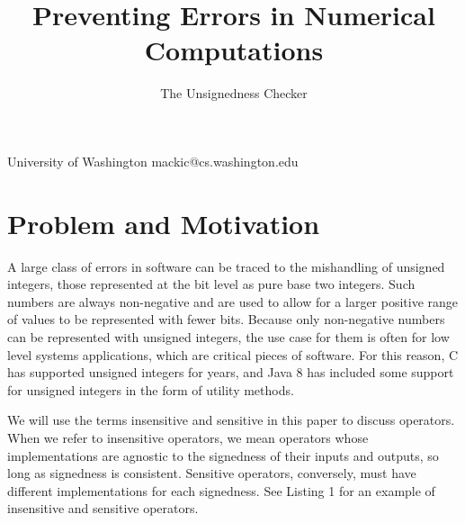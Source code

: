 \documentclass{sigplanconf}
\begin{document}
\setlength{\pdfpageheight}{\paperheight}
\setlength{\pdfpagewidth}{\paperwidth}

\title{Preventing Errors in Numerical Computations}
\subtitle{The Unsignedness Checker}

           {University of Washington}
           {mackic@cs.washington.edu}

\maketitle


\section{Problem and Motivation}

A large class of errors in software can be traced to the mishandling of unsigned integers, those represented at the bit level as pure base two integers. Such numbers are always non-negative and are used to allow for a larger positive range of values to be represented with fewer bits. Because only non-negative numbers can be represented with unsigned integers, the use case for them is often for low level systems applications, which are critical pieces of software. For this reason, C has supported unsigned integers for years, and Java 8 has included some support for unsigned integers in the form of utility methods.

We will use the terms insensitive and sensitive in this paper to discuss operators. When we refer to insensitive operators, we mean operators whose implementations are agnostic to the signedness of their inputs and outputs, so long as signedness is consistent. Sensitive operators, conversely, must have different implementations for each signedness. See Listing 1 for an example of insensitive and sensitive operators.
\end{document}
